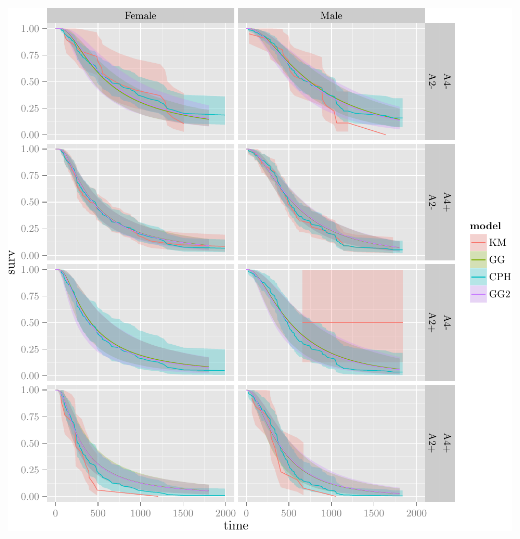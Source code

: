 \documentclass{article}\usepackage[]{graphicx}\usepackage[]{color}
\makeatletter
\def\maxwidth{ %
  \ifdim\Gin@nat@width>\linewidth
    \linewidth
  \else
    \Gin@nat@width
  \fi
}
\newenvironment{knitrout}{}{} %
\makeatother
\begin{document}
\begin{knitrout}
{\centering \includegraphics[width=\maxwidth]{figure/05-final-fit-assessment-2-2} 

}



\end{knitrout}
\end{document}
